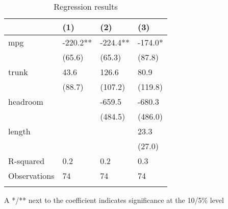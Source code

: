 \documentclass{article}
\begin{document}
\begin{table}[tbp] \centering
{}

\caption{Regression results}
\begin{tabularx}{\textwidth}{lCCC}

\toprule
&{(1)}&{(2)}&{(3)} \tabularnewline
\midrule\addlinespace[1.5ex]
mpg&-220.2**&-224.4**&-174.0* \tabularnewline
&(65.6)&(65.3)&(87.8) \tabularnewline
trunk&43.6&126.6&80.9 \tabularnewline
&(88.7)&(107.2)&(119.8) \tabularnewline
headroom&&-659.5&-680.3 \tabularnewline
&&(484.5)&(486.0) \tabularnewline
length&&&23.3 \tabularnewline
&&&(27.0) \tabularnewline
\midrule R-squared&0.2&0.2&0.3 \tabularnewline
Observations&74&74&74 \tabularnewline
\bottomrule \addlinespace[1.5ex]

\end{tabularx}
\begin{flushleft}
\footnotesize A */** next to the coefficient indicates significance at the 10/5\% level
\end{flushleft}
\end{table}
\end{document}
